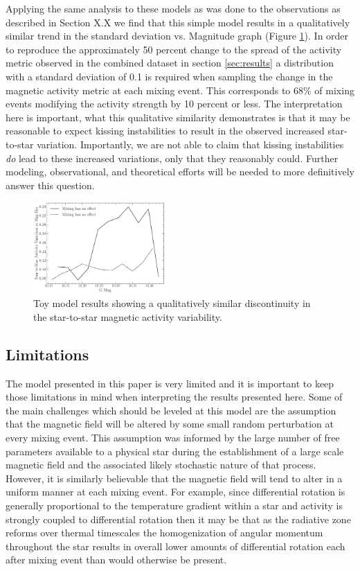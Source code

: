 Applying the same analysis to these models as was done to the observations as
described in Section {\color{red} X.X} we find that this simple model results
in a qualitatively similar trend in the standard deviation vs. Magnitude graph
(Figure \ref{fig:model}). In order to reproduce the approximately 50 percent
change to the spread of the activity metric observed in the combined dataset in
section \ref{sec:results} a distribution with a standard deviation of 0.1 is required when sampling the change in the magnetic activity metric at each mixing event. This corresponds to 68\% of mixing events modifying the activity strength by 10 percent or less. The interpretation here is important, what
this qualitative similarity demonstrates is that it may be reasonable to expect
kissing instabilities to result in the observed increased star-to-star
variation. Importantly, we are not able to claim that kissing instabilities
\textit{do} lead to these increased variations, only that they reasonably
could. Further modeling, observational, and theoretical efforts will be needed
to more definitively answer this question.

\begin{figure}
  \centering
  \includegraphics[width=0.45\textwidth]{figures/jaoMagActivity/SpreadModel.pdf}
  \caption{Toy model results showing a qualitatively similar discontinuity in the star-to-star magnetic activity variability.}
  \label{fig:model}
\end{figure}

\subsection{Limitations}
The model presented in this paper is very limited and it is important to keep
those limitations in mind when interpreting the results presented here. Some of
the main challenges which should be leveled at this model are the assumption
that the magnetic field will be altered by some small random perturbation at
every mixing event. This assumption was informed by the large number of free
parameters available to a physical star during the establishment of a large scale 
magnetic field and the associated likely stochastic nature of that process.
However, it is similarly believable that the magnetic field will tend to alter in
a uniform manner at each mixing event. For example, since differential rotation
is generally proportional to the temperature gradient within a star and activity is
strongly coupled to differential rotation then it may be that as the radiative zone reforms over thermal timescales the homogenization of angular momentum throughout the star results in overall lower amounts of differential rotation each after mixing event than would otherwise be present.

